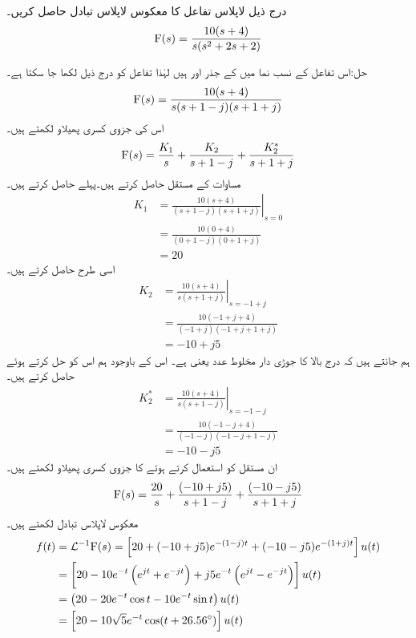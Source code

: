 درج ذیل لاپلاس تفاعل کا معکوس لاپلاس تبادل حاصل کریں۔
\begin{align*}
{\ensuremath{{\textup{F}}}}(s)=\frac{10(s+4)}{s(s^2+2s+2)}
\end{align*}

حل:اس تفاعل کے نسب نما میں  کے جذر  اور  ہیں لہٰذا تفاعل کو درج ذیل لکھا جا سکتا ہے۔
\begin{align*}
{\ensuremath{{\textup{F}}}}(s)=\frac{10(s+4)}{s(s+1-j)(s+1+j)}
\end{align*}
اس کی جزوی کسری پھیلاو لکھتے ہیں۔
\begin{align*}
{\ensuremath{{\textup{F}}}}(s)=\frac{K_1}{s}+\frac{K_2}{s+1-j}+\frac{K^*_2}{s+1+j}
\end{align*}
مساوات کے مستقل حاصل کرتے ہیں۔پہلے  حاصل کرتے ہیں۔
\begin{align*}
K_1&=\left. \frac{10(s+4)}{(s+1-j)(s+1+j)} \right|_{s=0}\\
&=\frac{10(0+4)}{(0+1-j)(0+1+j)} \\
&=20
\end{align*}
اسی طرح  حاصل کرتے ہیں۔
\begin{align*}
K_2&=\left. \frac{10(s+4)}{s(s+1+j)} \right|_{s=-1+j}\\
&=\frac{10(-1+j+4)}{(-1+j)(-1+j+1+j)} \\
&=-10+j5
\end{align*}
ہم جانتے ہیں کہ  درج بالا کا جوڑی دار مخلوط عدد یعنی  ہے۔ اس کے باوجود ہم اس کو حل کرتے ہوئے حاصل کرتے ہیں۔
 \begin{align*}
K^*_2&=\left. \frac{10(s+4)}{s(s+1-j)} \right|_{s=-1-j}\\
&=\frac{10(-1-j+4)}{(-1-j)(-1-j+1-j)} \\
&=-10-j5
\end{align*}
ان مستقل کو استعمال کرتے ہوئے   کا جزوی کسری پھیلاو  لکھتے ہیں۔
\begin{align*}
{\ensuremath{{\textup{F}}}}(s)=\frac{20}{s}+\frac{(-10+j5)}{s+1-j}+\frac{(-10-j5)}{s+1+j}
\end{align*}
معکوس لاپلاس تبادل لکھتے ہیں۔
\begin{align*}
f(t)&=\mathcal{L}^{-1} {{\textup{F}}}(s)=\left[20+(-10+j5)e^{-(1-j)t}+(-10-j5)e^{-(1+j)t}\right]u(t)\\
&=\left[20-10e^{-t} \left(e^{jt}+e^{-jt}\right)+j5e^{-t}\left(e^{jt}-e^{-jt}\right)\right]u(t)\\
&=\left(20-20e^{-t}\cos t-10e^{-t}\sin t\right)u(t)\\
&=\left[20-10\sqrt{5}e^{-t}\cos(t+26.56^{\circ})\right]u(t)
\end{align*}

